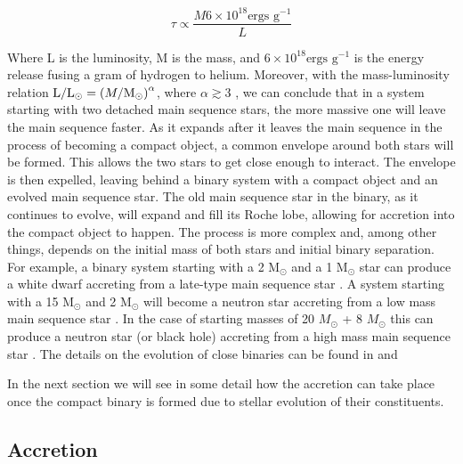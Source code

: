 \begin{equation}
        \tau \propto \frac{ M 6 \times 10^{18} \text{ergs g}^{-1}}{L}
\end{equation}

Where L is the luminosity, M is the mass,  and $6\times 10^{18} \text{ergs g}^{-1}$ is the energy release fusing a gram of hydrogen to helium. Moreover, with the mass-luminosity relation $ \text L / \text L _\odot = \left  (M / \text M _\odot \right )^\alpha $, where $\alpha \gtrsim 3$ \citep[e.g.][]{de2008stars}, we can conclude that in a system starting with two detached main sequence stars, the more massive one will leave the main sequence faster. As it expands after it leaves the main sequence in the process of becoming a compact object, a common envelope around both stars will be formed. This allows the two stars to get close enough to interact. The envelope is then expelled, leaving behind a binary system with a compact object and an evolved main sequence star. The old main sequence star in the binary, as it continues to evolve, will expand and fill its Roche lobe, allowing for accretion into the compact object to happen.  The process is more complex and, among other things, depends on the initial mass of both stars and initial binary separation. For example, a binary system starting with a 2 M$_\odot$  and  a 1 M$_\odot$ star can produce a white dwarf accreting from a late-type main sequence star \citep{kippenhahn_entwicklung_1967,de_loore_structure_1992}. A system starting with a 15 M$_\odot$ and 2 M$_\odot$ will become a neutron star accreting from a low mass main sequence star \citep{heuvel_late_1976}. In the case of starting masses of 20 $M_\odot$ + 8 $M_\odot$ this can produce a neutron star (or black hole) accreting from a high mass main sequence star \citep{heuvel_late_1976}. The details on the evolution of close binaries can be found in \cite{postnov_evolution_2014} and \cite{de2008stars}


In the next section we will see in some detail how the accretion can take place once the compact binary is formed due to stellar evolution of their constituents. 

\subsection{Accretion}

